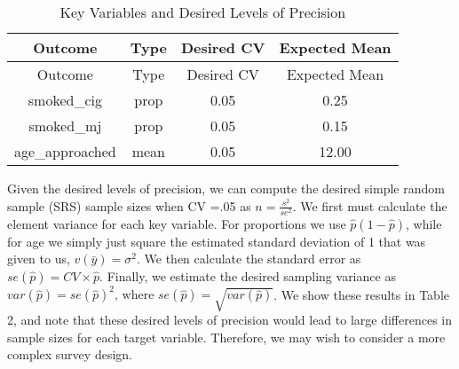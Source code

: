 \documentclass[
  12pt]{article}
\begin{document}
\begin{longtable}[]{@{}cccc@{}}
\caption{Key Variables and Desired Levels of Precision}\tabularnewline
\toprule\noalign{}
Outcome & Type & Desired CV & Expected Mean \\
\midrule\noalign{}
\endfirsthead
\toprule\noalign{}
Outcome & Type & Desired CV & Expected Mean \\
\midrule\noalign{}
\endhead
\bottomrule\noalign{}
\endlastfoot
smoked\_cig & prop & 0.05 & 0.25 \\
smoked\_mj & prop & 0.05 & 0.15 \\
age\_approached & mean & 0.05 & 12.00 \\
\end{longtable}

Given the desired levels of precision, we can compute the desired simple
random sample (SRS) sample sizes when CV =.05 as
\(n = \frac{s^2}{se^2}\). We first must calculate the element variance
for each key variable. For proportions we use \(\hat{p}(1-\hat{p})\),
while for age we simply just square the estimated standard deviation of
1 that was given to us, \(v(\bar{y}) = \sigma^2\). We then calculate the
standard error as \(se(\hat{p}) = CV \times \hat{p}\). Finally, we
estimate the desired sampling variance as
\(var(\hat{p}) =  se(\hat{p})^2 \text{, where }  se(\hat{p}) = \sqrt{var(\hat{p})}\).
We show these results in Table 2, and note that these desired levels of
precision would lead to large differences in sample sizes for each
target variable. Therefore, we may wish to consider a more complex
survey design.
\end{document}

